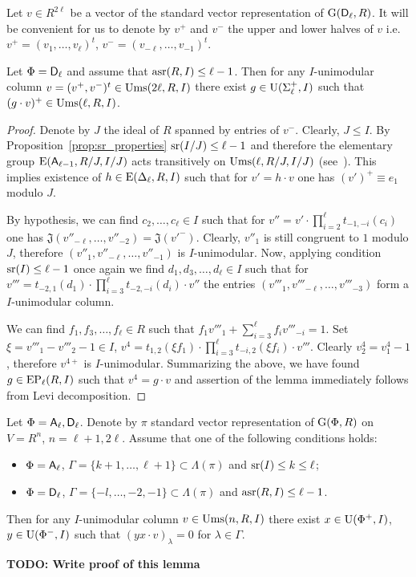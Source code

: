 Let $v\in R^{2\ell}$ be a vector of the standard vector representation of $\operatorname{G}(\mathsf{D}_\ell, R)$.
It will be convenient for us to denote by $v^+$ and $v^-$ the upper and lower halves of $v$ i.e. $v^+=(v_1,\ldots, v_\ell)^t$, $v^-=(v_{-\ell},\ldots, v_{-1})^t$.
\begin{lemma}\label{lemma:asrUnip}
 Let $\Phi=\mathsf{D}_\ell$ and assume that $\operatorname{asr}(R, I)\leq \ell -1$. Then for any $I$-unimodular column $v=(v^+, v^-)^t\in\operatorname{Ums}(2\ell, R, I)$
 there exist $g\in\operatorname{U}(\Sigma^+_\ell, I)$ such that $(g \cdot v)^+ \in \operatorname{Ums}(\ell, R, I)$.
\end{lemma}
\begin{proof} Denote by $J$ the ideal of $R$ spanned by entries of $v^-$. Clearly, $J \leq I$.
By Proposition~\ref{prop:sr_properties} $\operatorname{sr}(I/J) \leq \ell-1$ and therefore
the elementary group $\operatorname{E}(\mathsf{A}_{\ell-1}, R/J, I/J)$ acts transitively on $\operatorname{Ums}(\ell, R/J, I/J)$ (see~\cite[Theorem~2.3c]{Va69}). 
This implies existence of $h\in \operatorname{E}(\Delta_\ell, R, I)$ such that for $v' = h \cdot v$ one has $(v')^+ \equiv e_1$ modulo $J$.

By hypothesis, we can find $c_2,\ldots, c_\ell\in I$ such that for $v''=v'\cdot \prod\limits_{i=2}^{\ell}t_{-1, -i}(c_i)$ one has
$\mathfrak{J}(v''_{-\ell},\ldots, v''_{-2}) = \mathfrak{J}(v'^-)$. Clearly, $v''_1$ is still congruent to $1$ modulo $J$, therefore 
$(v''_1, v''_{-\ell},\ldots, v''_{-1})$ is $I$-unimodular. Now, applying condition $\operatorname{sr}(I) \leq \ell-1$ once again we find
$d_1,d_3,\ldots, d_{\ell}\in I$ such that for $v'''=t_{-2,1}(d_1) \cdot \prod\limits_{i=3}^{\ell} t_{-2,-i}(d_i) \cdot v''$
the entries $(v'''_1, v'''_{-\ell},\ldots, v'''_{-3})$ form a $I$-unimodular column.

We can find $f_1, f_3,\ldots, f_\ell \in R$ such that $f_1v'''_1+\sum\limits_{i=3}^\ell f_i v'''_{-i} = 1$.
Set $\xi = v'''_1-v'''_2-1 \in I$, $v^4=t_{1,2}(\xi f_1) \cdot \prod\limits_{i=3}^\ell t_{-i,2}(\xi f_i) \cdot v'''$.
Clearly $v^4_2 = v^4_1-1$, therefore $v^{4+}$ is $I$-unimodular.
Summarizing the above, we have found $g\in \operatorname{EP}_\ell(R, I)$ such that $v^4=g \cdot v$
and assertion of the lemma immediately follows from Levi decomposition. \end{proof}

\begin{lemma} \label{lemma:uraction} 
Let $\Phi=\mathsf{A}_\ell, \mathsf{D}_\ell$. Denote by $\pi$ standard vector representation of $\operatorname{G}(\Phi, R)$ on $V=R^n$, $n=\ell+1,2\ell$.
Assume that one of the following conditions holds:
\begin{itemize}
 \item $\Phi=\mathsf{A}_\ell$, $\Gamma=\{ k+1, \ldots, \ell+1\} \subset \Lambda(\pi)$ and $\operatorname{sr}(I)\leq k\leq \ell$;
 \item $\Phi=\mathsf{D}_\ell$, $\Gamma=\{-l,\ldots, -2, -1\} \subset \Lambda(\pi)$ and $\operatorname{asr}(R, I)\leq \ell-1$. 
\end{itemize}
Then for any $I$-unimodular column $v\in \operatorname{Ums}(n, R, I)$ there exist $x\in \operatorname{U}(\Phi^+, I)$, $y\in \operatorname{U}(\Phi^-, I)$ such that $(yx \cdot v)_\lambda = 0$ for $\lambda\in \Gamma$.
\end{lemma}
\textbf{TODO: Write proof of this lemma}
